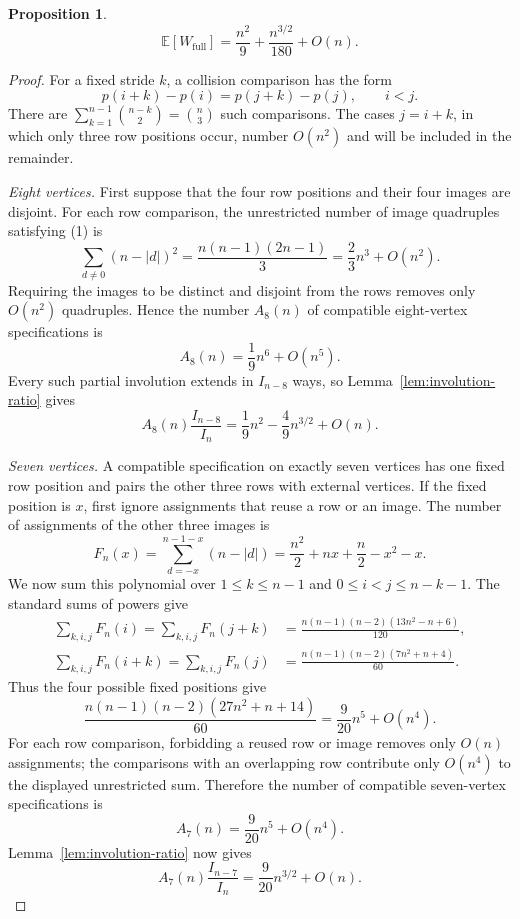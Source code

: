 \documentclass[10pt,a4paper]{amsart}
\newtheorem{proposition}{Proposition}
\begin{document}
\begin{proposition}
\label{prop:bulk}
\[
\mathbb{E}[W_{\mathrm{full}}]
=\frac{n^2}{9}+\frac{n^{3/2}}{180}+O(n).
\]
\end{proposition}

\begin{proof}
For a fixed stride $k$, a collision comparison has the form
\[
p(i+k)-p(i)=p(j+k)-p(j),\qquad i<j.
\tag{1}
\]
There are
$\sum_{k=1}^{n-1}\binom{n-k}{2}=\binom n3$ such comparisons.  The cases
$j=i+k$, in which only three row positions occur, number $O(n^2)$ and
will be included in the remainder.

\emph{Eight vertices.}
First suppose that the four row positions and their four images are
disjoint.  For each row comparison, the unrestricted number of image
quadruples satisfying (1) is
\[
\sum_{d\ne0}(n-|d|)^2
=\frac{n(n-1)(2n-1)}{3}
=\frac23n^3+O(n^2).
\]
Requiring the images to be distinct and disjoint from the rows removes
only $O(n^2)$ quadruples.  Hence the number $A_8(n)$ of compatible
eight-vertex specifications is
\[
A_8(n)=\frac19n^6+O(n^5).
\]
Every such partial involution extends in $I_{n-8}$ ways, so
Lemma~\ref{lem:involution-ratio} gives
\[
A_8(n)\frac{I_{n-8}}{I_n}
=\frac19n^2-\frac49n^{3/2}+O(n).
\tag{2}
\]

\emph{Seven vertices.}
A compatible specification on exactly seven vertices has one fixed row
position and pairs the other three rows with external vertices.  If the
fixed position is $x$, first ignore assignments that reuse a row or an
image.  The number of assignments of the other three images is
\[
F_n(x)=\sum_{d=-x}^{n-1-x}(n-|d|)
=\frac{n^2}{2}+nx+\frac n2-x^2-x.
\tag{3}
\]
We now sum this polynomial over
$1\leq k\leq n-1$ and $0\leq i<j\leq n-k-1$.  The standard sums of
powers give
\begin{align*}
\sum_{k,i,j}F_n(i)
=\sum_{k,i,j}F_n(j+k)
&=\frac{n(n-1)(n-2)(13n^2-n+6)}{120},\\
\sum_{k,i,j}F_n(i+k)
=\sum_{k,i,j}F_n(j)
&=\frac{n(n-1)(n-2)(7n^2+n+4)}{60}.
\end{align*}
Thus the four possible fixed positions give
\[
\frac{n(n-1)(n-2)(27n^2+n+14)}{60}
=\frac9{20}n^5+O(n^4).
\]
For each row comparison, forbidding a reused row or image removes only
$O(n)$ assignments; the comparisons with an overlapping row contribute
only $O(n^4)$ to the displayed unrestricted sum.  Therefore the number
of compatible seven-vertex specifications is
\[
A_7(n)=\frac9{20}n^5+O(n^4).
\]
Lemma~\ref{lem:involution-ratio} now gives
\[
A_7(n)\frac{I_{n-7}}{I_n}
=\frac9{20}n^{3/2}+O(n).
\tag{4}
\]


\end{proof}
\end{document}
